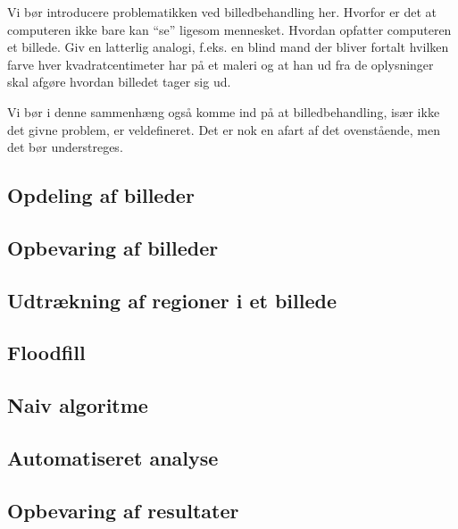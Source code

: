 {
{\sffamily Vi bør introducere problematikken ved billedbehandling her.
Hvorfor er det at computeren ikke bare kan ``se'' ligesom mennesket.
Hvordan opfatter computeren et billede. Giv en latterlig analogi, f.eks.
en blind mand der bliver fortalt hvilken farve hver kvadratcentimeter
har på et maleri og at han ud fra de oplysninger skal afgøre hvordan
billedet tager sig ud.

Vi bør i denne sammenhæng også komme ind på at billedbehandling, især
ikke det givne problem, er veldefineret. Det er nok en afart af det
ovenstående, men det bør understreges.
}

\subsection{Opdeling af billeder}


\subsection{Opbevaring af billeder\label{section_opbv_billeder}}


\subsection{Udtrækning af regioner i et billede}

\subsection{Floodfill}


\subsection{Naiv algoritme}


\subsection{Automatiseret analyse}

\subsection{Opbevaring af resultater\label{section_results}}


}

